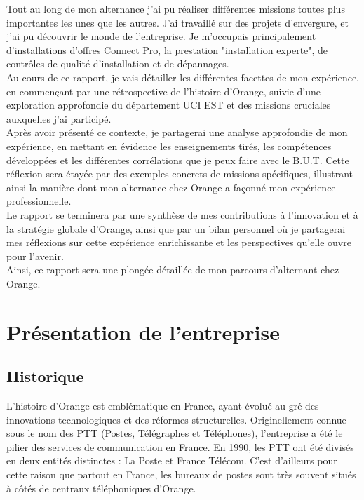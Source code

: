 \documentclass[12pt, a4paper]{article}
\begin{document}
Tout au long de mon alternance j'ai pu réaliser différentes missions
toutes plus importantes les unes que les autres. J'ai travaillé sur des projets
d'envergure, et j'ai pu découvrir le monde de l'entreprise.
Je m'occupais principalement d'installations d'offres
Connect Pro, la prestation "installation experte", 
de contrôles de qualité d'installation et de dépannages.\\


Au cours de ce rapport, je vais détailler les différentes facettes de mon expérience,
en commençant par une rétrospective de l'histoire d'Orange, suivie d'une exploration
approfondie du département UCI EST et des missions cruciales auxquelles
j'ai participé.\\
Après avoir présenté ce contexte, je partagerai une analyse approfondie
de mon expérience, en mettant en évidence les enseignements tirés,
les compétences développées et les différentes corrélations 
que je peux faire avec le B.U.T. Cette réflexion sera étayée par des exemples
concrets de missions spécifiques, illustrant ainsi la manière dont mon
alternance chez Orange a façonné mon expérience professionnelle.\\

Le rapport se terminera par une synthèse de mes contributions à
l'innovation et à la stratégie globale d'Orange, ainsi que par un
bilan personnel où je partagerai mes réflexions sur cette expérience
enrichissante et les perspectives qu'elle ouvre pour l'avenir.\\
Ainsi, ce rapport sera une plongée détaillée de mon parcours
d'alternant chez Orange.


\newpage
\section{Présentation de l'entreprise}
\subsection{Historique}
L'histoire d'Orange est emblématique en France, ayant évolué au gré des
innovations technologiques et des réformes structurelles. Originellement connue
sous le nom des PTT (Postes, Télégraphes et Téléphones), 
l'entreprise a été le pilier des services de communication en
France. En 1990, les PTT ont été divisés en deux entités distinctes : La Poste et France Télécom.
C'est d'ailleurs pour cette raison que partout en France, les bureaux de postes 
sont très souvent situés à côtés de centraux téléphoniques d'Orange.\\
\end{document}
